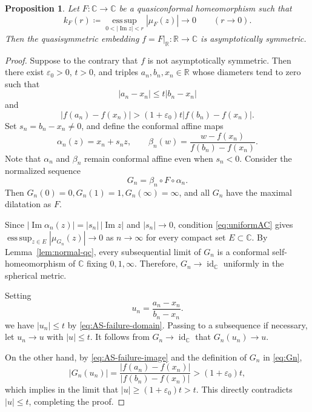 \documentclass[11pt]{amsart}
\numberwithin{equation}{section}
\newtheorem{proposition}[theorem]{Proposition}
\theoremstyle{definition} %
\theoremstyle{remarkstyle}
\newcommand{\R}{\mathbb{R}}
\newcommand{\C}{\mathbb{C}}
\newcommand{\id}{\operatorname{id}}
\newcommand{\esssup}{\operatorname*{ess\,sup}}
\begin{document}
\begin{proposition}\label{prop:AC-boundary-AS}
Let $F\colon\C\to\C$ be a quasiconformal homeomorphism such that
\begin{equation}\label{eq:uniformAC}
 k_F(r)\coloneqq \esssup_{0<|\operatorname{Im}z|<r}|\mu_F(z)|\to 0\qquad(r\to0).
\end{equation}
Then the quasisymmetric embedding $f=F|_{\R}\colon\R\to\C$ is asymptotically symmetric.
\end{proposition}

\begin{proof}
Suppose to the contrary that $f$ is not asymptotically symmetric. Then there exist $\varepsilon_0>0$, $t>0$, and triples $a_n,b_n,x_n\in\R$ whose diameters tend to zero such that
\begin{equation}\label{eq:AS-failure-domain}
 |a_n-x_n|\leq t|b_n-x_n|
\end{equation}
and
\begin{equation}\label{eq:AS-failure-image}
 |f(a_n)-f(x_n)|>(1+\varepsilon_0)t|f(b_n)-f(x_n)|.
\end{equation}
Set $s_n=b_n-x_n\ne0$, and define the conformal affine maps
\[
\alpha_n(z)=x_n+s_nz, \qquad\beta_n(w)= \frac{w-f(x_n)}{f(b_n)-f(x_n)}.
\]
Note that $\alpha_n$ and $\beta_n$ remain conformal affine even when $s_n<0$.  
Consider the normalized sequence
\begin{equation}\label{eq:Gn}
 G_n=\beta_n\circ F\circ\alpha_n.
\end{equation}
Then $G_n(0)=0, G_n(1)=1,G_n(\infty)=\infty$, and all $G_n$ have the maximal dilatation as $F$.

Since $|\operatorname{Im}\alpha_n(z)|=|s_n|\,|\operatorname{Im}z|$ and $|s_n|\to0$, condition \eqref{eq:uniformAC} gives $\esssup_{z\in E}|\mu_{G_n}(z)|\to 0$ as $n \to \infty$ for every compact set $E\subset\C$.
By Lemma~\ref{lem:normal-qc}, every subsequential limit of $G_n$ is a conformal self-homeomorphism of $\C$ fixing $0,1,\infty$.  
Therefore,
$G_n\to \id_{\C}$
uniformly in the spherical metric.

Setting
\[
 u_n=\frac{a_n-x_n}{b_n-x_n}.
\]
we have $|u_n|\leq t$ by \eqref{eq:AS-failure-domain}. 
Passing to a subsequence if necessary, let $u_n\to u$ with $|u|\leq t$.  
It follows from $G_n\to \id_{\C}$ that $G_n(u_n)\to u$.

On the other hand, by \eqref{eq:AS-failure-image} and the definition of $G_n$ in \eqref{eq:Gn},
\[
 |G_n(u_n)|=\frac{|f(a_n)-f(x_n)|}{|f(b_n)-f(x_n)|}>(1+\varepsilon_0)t,
\]
which implies in the limit that $|u| \geq (1+\varepsilon_0)t > t$. This directly contradicts $|u|\leq t$, completing the proof.
\end{proof}
\end{document}
